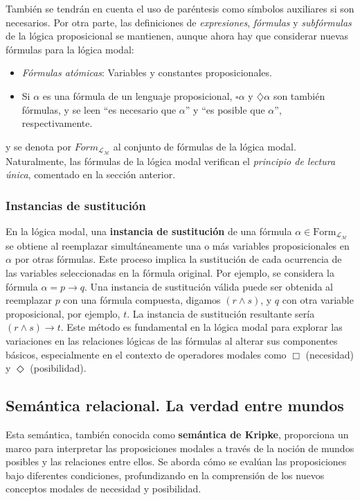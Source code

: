También se tendrán en cuenta el uso de paréntesis como símbolos auxiliares si son necesarios. Por otra parte, las definiciones de \textit{expresiones}, \textit{fórmulas} y \textit{subfórmulas} de la lógica proposicional se mantienen, aunque ahora hay que considerar nuevas fórmulas para la lógica modal:

\begin{itemize}
    \item \textit{Fórmulas atómicas}: Variables y constantes proposicionales.
    \item Si $\alpha$ es una fórmula de un lenguaje proposicional, $\square \alpha$ y $\diamondsuit \alpha$ son también fórmulas, y se leen ``es necesario que $\alpha$'' y ``es posible que $\alpha$'', respectivamente.
\end{itemize}

y se denota por $Form_{\mathcal{L}_{\mathcal{M}}}$ al conjunto de fórmulas de la lógica modal. Naturalmente, las fórmulas de la lógica modal verifican el \textit{principio de lectura única}, comentado en la sección anterior.

\subsubsection{Instancias de sustitución}

En la lógica modal, una \textbf{instancia de sustitución} de una fórmula $\alpha \in \text{Form}_{\mathcal{L}_{\mathcal{M}}}$ se obtiene al reemplazar simultáneamente una o más variables proposicionales en $\alpha$ por otras fórmulas. Este proceso implica la sustitución de cada ocurrencia de las variables seleccionadas en la fórmula original. Por ejemplo, se considera la fórmula $\alpha = p \rightarrow q$. Una instancia de sustitución válida puede ser obtenida al reemplazar $p$ con una fórmula compuesta, digamos $(r \land s)$, y $q$ con otra variable proposicional, por ejemplo, $t$. La instancia de sustitución resultante sería $(r \land s) \rightarrow t$. Este método es fundamental en la lógica modal para explorar las variaciones en las relaciones lógicas de las fórmulas al alterar sus componentes básicos, especialmente en el contexto de operadores modales como $\Box$ (necesidad) y $\Diamond$ (posibilidad).


\subsection{Semántica relacional. La verdad entre mundos}\label{subsection:lmodalsemantic}
Esta semántica, también conocida como \textbf{semántica de Kripke}, proporciona un marco para interpretar las proposiciones modales a través de la noción de mundos posibles y las relaciones entre ellos. Se aborda cómo se evalúan las proposiciones bajo diferentes condiciones, profundizando en la comprensión de los nuevos conceptos modales de necesidad y posibilidad.

